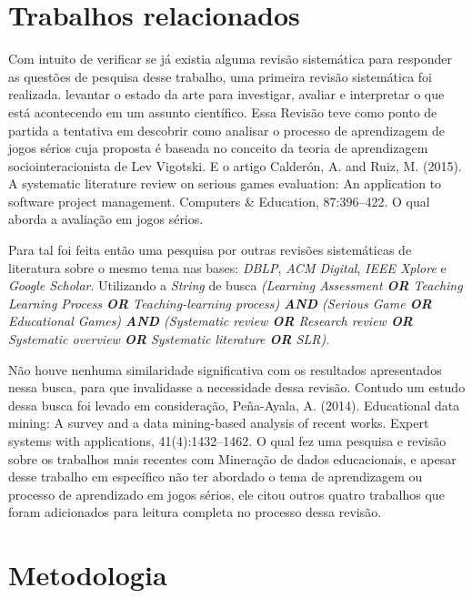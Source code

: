 \documentclass[12pt]{article}
\begin{document}
\section{Trabalhos relacionados}\label{sec:trabalhos_relacionados}

Com intuito de verificar se já existia alguma revisão sistemática para responder as questões de pesquisa desse trabalho, uma primeira revisão sistemática foi realizada.  
levantar o estado da arte para investigar, avaliar e interpretar o que está acontecendo em um assunto científico. Essa Revisão teve como ponto de partida a tentativa em descobrir como analisar o processo de aprendizagem de jogos sérios cuja proposta é baseada no conceito da teoria de aprendizagem sociointeracionista de Lev Vigotski. E o artigo Calderón, A. and Ruiz, M. (2015). A systematic literature review on serious games evaluation: An application to software project management. Computers \& Education, 87:396–422. O qual aborda a avaliação em jogos sérios.

Para tal foi feita então uma pesquisa por outras revisões sistemáticas de literatura sobre o mesmo tema nas bases: \textit{DBLP}, \textit{ACM Digital}, \textit{IEEE Xplore} e \textit{Google Scholar}. Utilizando a \textit{String} de busca \textit{(Learning Assessment \textbf{OR} Teaching Learning Process \textbf{OR} Teaching-learning process) \textbf{AND} (Serious Game \textbf{OR} Educational Games) \textbf{AND} (Systematic review \textbf{OR} Research review \textbf{OR} Systematic overview \textbf{OR} Systematic literature \textbf{OR} SLR)}.

Não houve nenhuma similaridade significativa com os resultados apresentados nessa busca, para que invalidasse a necessidade dessa revisão. Contudo um estudo dessa busca foi levado em consideração, Peña-Ayala, A. (2014). Educational data mining: A survey and a data mining-based analysis of recent works. Expert systems with applications, 41(4):1432–1462. O qual fez uma pesquisa e revisão sobre os trabalhos mais recentes com Mineração de dados educacionais, e apesar desse trabalho em específico não ter abordado o tema de aprendizagem ou processo de aprendizado em jogos sérios, ele citou outros quatro trabalhos que foram adicionados para leitura completa no processo dessa revisão.

\section{Metodologia}\label{sec:metodos_utilizado}
\end{document}
